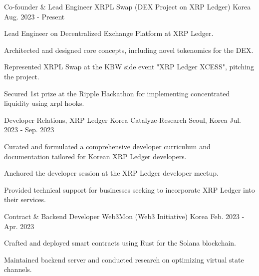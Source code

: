 


\begin{cventries}


\cventry
{Co-founder \& Lead Engineer} %
{XRPL Swap (DEX Project on XRP Ledger)} %
{Korea} %
{Aug. 2023 - Present} %
{ %
\begin{cvitems}
\item {Lead Engineer on Decentralized Exchange Platform at XRP Ledger.}
\item {Architected and designed core concepts, including novel tokenomics for the DEX.}
\item {Represented XRPL Swap at the KBW side event "XRP Ledger XCESS", pitching the project.}
\item {Secured 1st prize at the Ripple Hackathon for implementing concentrated liquidity using xrpl hooks.}
\end{cvitems}
}


\cventry
{Developer Relations, XRP Ledger Korea} %
{Catalyze-Research} %
{Seoul, Korea} %
{Jul. 2023 - Sep. 2023} %
{ %
\begin{cvitems}
\item {Curated and formulated a comprehensive developer curriculum and documentation tailored for Korean XRP Ledger developers.}
\item {Anchored the developer session at the XRP Ledger developer meetup.}
\item {Provided technical support for businesses seeking to incorporate XRP Ledger into their services.}
\end{cvitems}
}


\cventry
{Contract \& Backend Developer} %
{Web3Mon (Web3 Initiative)} %
{Korea} %
{Feb. 2023 - Apr. 2023} %
{ %
\begin{cvitems}
\item {Crafted and deployed smart contracts using Rust for the Solana blockchain.}
\item {Maintained backend server and conducted research on optimizing virtual state channels.}
\end{cvitems}
}


\end{cventries}
